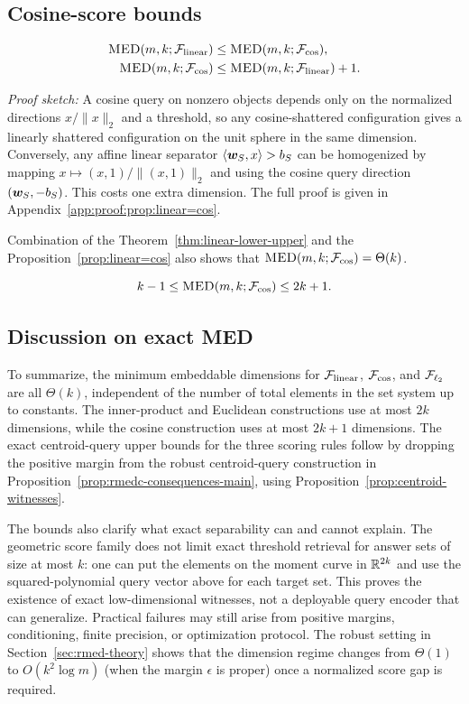 \documentclass{article}
\begin{document}
\subsection{Cosine-score bounds}

\begin{proposition}\label{prop:linear=cos}
\begin{align*}
    \textsc{MED}(m, k; \mathcal{F}_{\rm linear}) &\leq \textsc{MED}(m, k; \mathcal{F}_{\cos}), \\
    \textsc{MED}(m, k; \mathcal{F}_{\cos}) &\leq \textsc{MED}(m, k; \mathcal{F}_{\rm linear}) + 1.
\end{align*}
\end{proposition}
\noindent\textit{Proof sketch:} A cosine query on nonzero objects depends only on the normalized directions $x/\|x\|_2$ and a threshold, so any cosine-shattered configuration gives a linearly shattered configuration on the unit sphere in the same dimension. Conversely, any affine linear separator $\langle \bm{w}_S,x\rangle>b_S$ can be homogenized by mapping $x\mapsto (x,1)/\|(x,1)\|_2$ and using the cosine query direction $(\bm{w}_S,-b_S)$. This costs one extra dimension. The full proof is given in Appendix~\ref{app:proof:prop:linear=cos}.

Combination of the Theorem~\ref{thm:linear-lower-upper} and the Proposition~\ref{prop:linear=cos} also shows that $\textsc{MED}(m, k; \mathcal{F}_{\cos}) = \Theta(k)$.

\begin{theorem}\label{thm:cos-lower-upper}
    $$k-1\leq \textsc{MED}(m, k; \mathcal{F}_{\cos}) \leq 2k+1.$$
\end{theorem}

\subsection{Discussion on exact MED}
To summarize, the minimum embeddable dimensions for $\mathcal{F}_{\rm linear}$, $\mathcal{F}_{\cos}$, and $\mathcal{F}_{\ell_{2}}$ are all $\Theta(k)$, independent of the number of total elements in the set system up to constants. The inner-product and Euclidean constructions use at most $2k$ dimensions, while the cosine construction uses at most $2k+1$ dimensions. The exact centroid-query upper bounds for the three scoring rules follow by dropping the positive margin from the robust centroid-query construction in Proposition~\ref{prop:rmedc-consequences-main}, using Proposition~\ref{prop:centroid-witnesses}.

The bounds also clarify what exact separability can and cannot explain. The geometric score family does not limit exact threshold retrieval for answer sets of size at most $k$: one can put the elements on the moment curve in $\mathbb{R}^{2k}$ and use the squared-polynomial query vector above for each target set. This proves the existence of exact low-dimensional witnesses, not a deployable query encoder that can generalize. Practical failures may still arise from positive margins, conditioning, finite precision, or optimization protocol. The robust setting in Section~\ref{sec:rmed-theory} shows that the dimension regime changes from $\Theta(1)$ to $O(k^2\log m)$ (when the margin $\epsilon$ is proper) once a normalized score gap is required.
\end{document}
